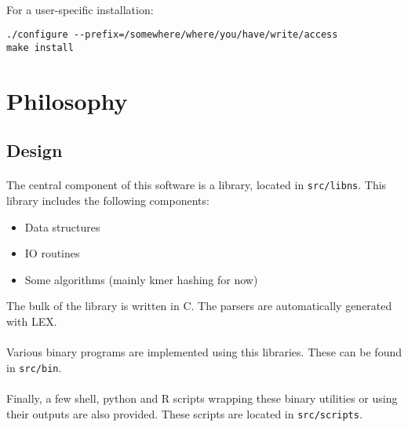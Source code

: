 \documentclass[a4paper,12pt]{article}
\begin{document}
\paragraph{}
For a user-specific installation:

\begin{verbatim}
./configure --prefix=/somewhere/where/you/have/write/access
make install
\end{verbatim}



\section{Philosophy}


\subsection{Design}

\paragraph{}
The central component of this software is a library, located in
\texttt{src/libns}.
This library includes the following components:
\begin{itemize}
    \item Data structures
    \item IO routines
    \item Some algorithms (mainly kmer hashing for now)
\end{itemize}
The bulk of the library is written in C.
The parsers are automatically generated with LEX.

\paragraph{}
Various binary programs are implemented using this libraries.
These can be found in \texttt{src/bin}.

\paragraph{}
Finally, a few shell, python and R scripts wrapping these binary utilities or
using their outputs are also provided.
These scripts are located in \texttt{src/scripts}.
\end{document}
